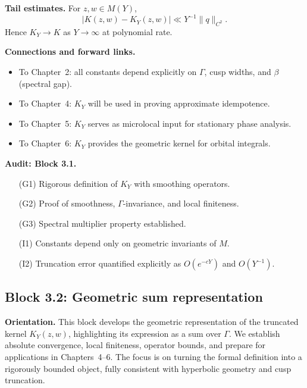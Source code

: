 \medskip

\noindent\textbf{Tail estimates.}
For $z,w\in M(Y)$,
\[
  |K(z,w)-K_{Y}(z,w)| \ll Y^{-1}\|q\|_{C^{2}}.
\]
Hence $K_{Y}\to K$ as $Y\to\infty$ at polynomial rate.

\medskip

\noindent\textbf{Connections and forward links.}
\begin{itemize}
  \item To Chapter~2: all constants depend explicitly on $\Gamma$, cusp widths, and $\beta$ (spectral gap). 
  \item To Chapter~4: $K_{Y}$ will be used in proving approximate idempotence. 
  \item To Chapter~5: $K_{Y}$ serves as microlocal input for stationary phase analysis. 
  \item To Chapter~6: $K_{Y}$ provides the geometric kernel for orbital integrals. 
\end{itemize}

\medskip

\noindent\textbf{Audit: Block 3.1.}
\begin{itemize}
  \item[(G1)] Rigorous definition of $K_{Y}$ with smoothing operators. 
  \item[(G2)] Proof of smoothness, $\Gamma$-invariance, and local finiteness. 
  \item[(G3)] Spectral multiplier property established. 
  \item[(I1)] Constants depend only on geometric invariants of $M$. 
  \item[(I2)] Truncation error quantified explicitly as $O(e^{-cY})$ and $O(Y^{-1})$. 
\end{itemize}



\subsection{Block 3.2: Geometric sum representation}\label{block:3.2}

\noindent
\textbf{Orientation.}
This block develops the geometric representation of the truncated kernel $K_{Y}(z,w)$,
highlighting its expression as a sum over $\Gamma$.
We establish absolute convergence, local finiteness, operator bounds,
and prepare for applications in Chapters~4–6.
The focus is on turning the formal definition into a rigorously bounded object,
fully consistent with hyperbolic geometry and cusp truncation.

